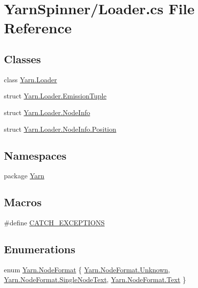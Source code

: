 \hypertarget{a00288}{\section{Yarn\-Spinner/\-Loader.cs File Reference}
\label{a00288}
}
\subsection*{Classes}
\begin{DoxyCompactItemize}
\item 
class \hyperlink{a00125}{Yarn.\-Loader}
\item 
struct \hyperlink{a00093}{Yarn.\-Loader.\-Emission\-Tuple}
\item 
struct \hyperlink{a00131}{Yarn.\-Loader.\-Node\-Info}
\item 
struct \hyperlink{a00137}{Yarn.\-Loader.\-Node\-Info.\-Position}
\end{DoxyCompactItemize}
\subsection*{Namespaces}
\begin{DoxyCompactItemize}
\item 
package \hyperlink{a00048}{Yarn}
\end{DoxyCompactItemize}
\subsection*{Macros}
\begin{DoxyCompactItemize}
\item 
\#define \hyperlink{a00288_a77a5bfa27437777ac8554e94e76e4e43}{C\-A\-T\-C\-H\-\_\-\-E\-X\-C\-E\-P\-T\-I\-O\-N\-S}
\end{DoxyCompactItemize}
\subsection*{Enumerations}
\begin{DoxyCompactItemize}
\item 
enum \hyperlink{a00048_ad7ebb46e7309ead8767383a672b3272f}{Yarn.\-Node\-Format} \{ \hyperlink{a00048_ad7ebb46e7309ead8767383a672b3272fa88183b946cc5f0e8c96b2e66e1c74a7e}{Yarn.\-Node\-Format.\-Unknown}, 
\hyperlink{a00048_ad7ebb46e7309ead8767383a672b3272faceeb33da53902872b63956f8df786cd8}{Yarn.\-Node\-Format.\-Single\-Node\-Text}, 
\hyperlink{a00048_ad7ebb46e7309ead8767383a672b3272fa9dffbf69ffba8bc38bc4e01abf4b1675}{Yarn.\-Node\-Format.\-Text}
 \}
\end{DoxyCompactItemize}



